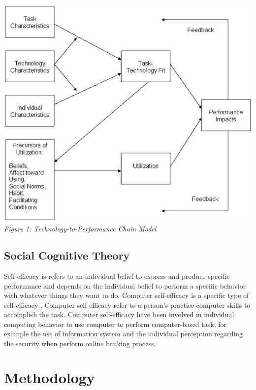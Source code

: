\documentclass[a4paper, 12pt]{article}
\begin{document}
\begin{center}
\includegraphics[scale=0.5]{figure1.png}\\
\textit{Figure 1: Technology-to-Performance Chain Model}
\end{center}

\subsection{Social Cognitive Theory}

Self-efficacy is refers to an individual belief to express and produce specific performance and depends on the individual belief to perform a specific behavior with whatever things they want to do. Computer self-efficacy is a specific type of self-efficacy \cite{davis1989user}, Computer self-efficacy refer to a person’s practice computer skills to accomplish the task. Computer self-efficacy have been involved in individual computing behavior to use computer to perform computer-based task, for example the use of information system and the individual perception regarding the security when perform online banking process.

\section{Methodology}
\end{document}
